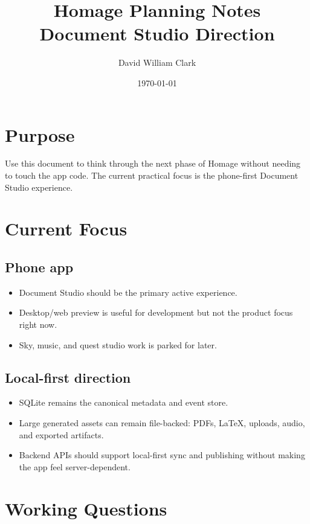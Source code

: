 \documentclass[11pt]{article}
\author{David William Clark}
\date{\today}
\title{Homage Planning Notes\\\medskip
\large Document Studio Direction}
\begin{document}
\maketitle
\setcounter{tocdepth}{2}
\tableofcontents

\section{Purpose}
\label{sec:org6e0dc00}

Use this document to think through the next phase of Homage without needing to
touch the app code. The current practical focus is the phone-first Document
Studio experience.
\section{Current Focus}
\label{sec:org7120b4c}

\subsection{Phone app}
\label{sec:org3853a12}

\begin{itemize}
\item Document Studio should be the primary active experience.
\item Desktop/web preview is useful for development but not the product focus right now.
\item Sky, music, and quest studio work is parked for later.
\end{itemize}
\subsection{Local-first direction}
\label{sec:org9d972f5}

\begin{itemize}
\item SQLite remains the canonical metadata and event store.
\item Large generated assets can remain file-backed: PDFs, \LaTeX{}, uploads, audio, and exported artifacts.
\item Backend APIs should support local-first sync and publishing without making the app feel server-dependent.
\end{itemize}
\section{Working Questions}
\label{sec:orge089bd7}
\end{document}
